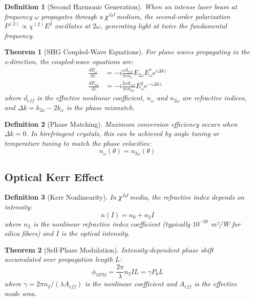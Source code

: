 \documentclass[a4paper, 11pt]{article}
\newtheorem{definition}{Definition}[section]
\newtheorem{theorem}{Theorem}[section]
\begin{document}
\begin{definition}[Second Harmonic Generation]
When an intense laser beam at frequency $\omega$ propagates through a χ⁽²⁾ medium, the
second-order polarization $P^{(2)} \propto \chi^{(2)}E^2$ oscillates at $2\omega$,
generating light at twice the fundamental frequency.
\end{definition}

\begin{theorem}[SHG Coupled-Wave Equations]
For plane waves propagating in the z-direction, the coupled-wave equations are:
\begin{align}
\frac{dE_\omega}{dz} &= -i\frac{\omega d_{eff}}{\pi c n_\omega} E_{2\omega} E_\omega^*
e^{i\Delta k z} \\
\frac{dE_{2\omega}}{dz} &= -i\frac{2\omega d_{eff}}{\pi c n_{2\omega}} E_\omega^2
e^{-i\Delta k z}
\end{align}
where $d_{eff}$ is the effective nonlinear coefficient, $n_\omega$ and $n_{2\omega}$ are
refractive indices, and $\Delta k = k_{2\omega} - 2k_\omega$ is the phase mismatch.
\end{theorem}

\begin{definition}[Phase Matching]
Maximum conversion efficiency occurs when $\Delta k = 0$. In birefringent crystals, this
can be achieved by angle tuning or temperature tuning to match the phase velocities:
\begin{equation}
n_\omega(\theta) = n_{2\omega}(\theta)
\end{equation}
\end{definition}

\subsection{Optical Kerr Effect}

\begin{definition}[Kerr Nonlinearity]
In χ⁽³⁾ media, the refractive index depends on intensity:
\begin{equation}
n(I) = n_0 + n_2 I
\end{equation}
where $n_2$ is the nonlinear refractive index coefficient (typically $10^{-20}$ m²/W for
silica fibers) and $I$ is the optical intensity.
\end{definition}

\begin{theorem}[Self-Phase Modulation]
Intensity-dependent phase shift accumulated over propagation length $L$:
\begin{equation}
\phi_{SPM} = \frac{2\pi}{\lambda} n_2 I L = \gamma P_0 L
\end{equation}
where $\gamma = 2\pi n_2/(\lambda A_{eff})$ is the nonlinear coefficient and $A_{eff}$ is
the effective mode area.
\end{theorem}
\end{document}
